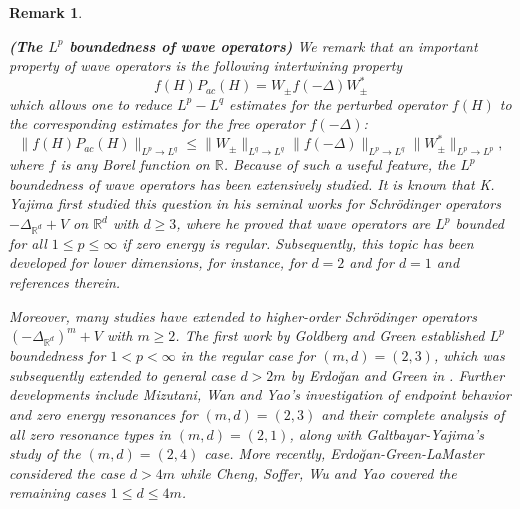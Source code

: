 \documentclass[reqno]{amsart}
\newtheorem{remark}[definition]{Remark}
\newcommand\R{\mathbb{R}}
\numberwithin{equation}{section}
\begin{document}
\begin{remark}\label{background}
{\rm {\bf(The $L^p$ boundedness of wave operators)} We remark that an important property of wave operators is the following {\textit{intertwining property}}
\begin{equation*}
f(H)P_{ac}(H)=W_{\pm}f(-\Delta)W^*_{\pm}
\end{equation*}
which allows one to reduce $L^p-L^q$ estimates for the perturbed operator $f(H)$ to the corresponding estimates for the free operator $f(-\Delta)$:
\begin{equation*}
\|f(H)P_{ac}(H)\|_{L^p\rightarrow L^q}\leq\|W_{\pm}\|_{L^q\rightarrow L^q}\|f(-\Delta)\|_{L^p\rightarrow L^q}\|W^*_{\pm}\|_{L^p\rightarrow L^p},
\end{equation*}
where $f$ is any Borel function on $\R$. Because of such a useful feature, the $L^p$ boundedness of wave operators has been extensively studied. 
It is known that K. Yajima first studied this question in his seminal works \cite{Yaj93,Yaj95a,Yaj95b,Yaj97}
for  Schr\"{o}dinger operators $-\Delta_{\R^d}+V$ on $\R^d$ with $d\geq3$, where he proved that wave operators are $L^p$ bounded for all $1\leq p\leq\infty$ if zero energy is regular. Subsequently, this topic has been developed for lower dimensions, for instance, \cite{Yaj99,JY02,EGG18} for $d=2$ and \cite{Wed99,GY00,DF06,DMW11,Wed22} for $d=1$ and references therein.

Moreover, many studies have extended to higher-order Schr\"{o}dinger operators $(-\Delta_{\R^d})^m+V$ with $m\geq2$. The first work \cite{GG21} by Goldberg and Green established $L^p$ boundedness for $1 < p < \infty$ in the regular case for $(m,d) = (2,3)$, which was subsequently extended to general case $d > 2m$ by Erdo\u{g}an and Green in \cite{EG22,EG23}. Further developments include Mizutani, Wan and Yao's investigation \cite{MWY24a,MWY25} of endpoint behavior and zero energy resonances for $(m,d) = (2,3)$ and their complete analysis \cite{MWY24} of all zero resonance types in $(m,d) = (2,1)$, along with Galtbayar-Yajima's study \cite{GY24} of the $(m,d) = (2,4)$ case. More recently, Erdo\u gan-Green-LaMaster \cite{EGL25} considered the case $d>4m$ while Cheng, Soffer, Wu and Yao \cite{CSWY25,CSWY25b} covered the remaining cases $1 \leq d \leq 4m$.
}    
\end{remark}
\end{document}
